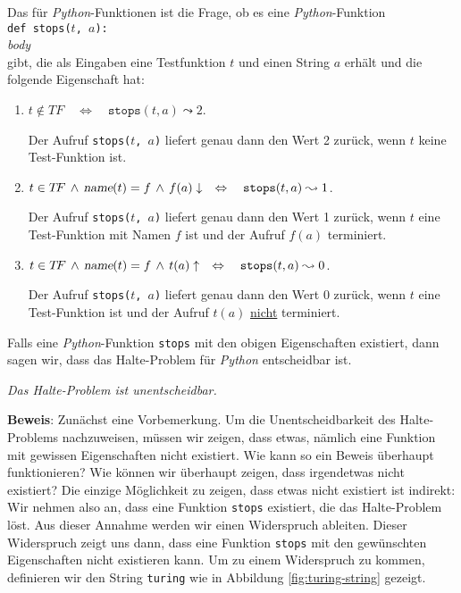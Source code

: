 \noindent
Das  für
\textsl{Python}-Funktionen ist die Frage, ob es eine \textsl{Python}-Funktion \\[0.2cm] 
\hspace*{1.3cm} \texttt{def stops($t$, $a$):}\\
\hspace*{2.1cm} \textsl{body}
\\[0.2cm]
gibt, die als Eingaben eine Testfunktion $t$ und einen String $a$ erhält und die folgende
Eigenschaft hat:
\begin{enumerate}
\item $t \not\in T\!F \quad\Leftrightarrow\quad \texttt{stops}(t, a) \leadsto 2$.

      Der Aufruf \texttt{stops($t$, $a$)} liefert genau dann den Wert 2 zurück, 
      wenn $t$ keine Test-Funktion ist.
\item $t \in T\!F \,\wedge\, \textsl{name}(t) = f \,\wedge\, f(a)\downarrow \quad\Leftrightarrow\quad
       \texttt{stops}(t, a) \leadsto 1$.

      Der Aufruf \texttt{stops($t$, $a$)} liefert genau dann den Wert 1 zurück,
      wenn $t$ eine Test-Funktion mit Namen $f$ ist und der Aufruf $f(a)$ terminiert.

\item $t \in T\!F  \,\wedge\, \textsl{name}(t) = f \,\wedge\, t(a)\uparrow \quad\Leftrightarrow\quad
       \texttt{stops}(t, a) \leadsto 0$.

      Der Aufruf \texttt{stops($t$, $a$)} liefert genau dann den Wert 0 zurück,
      wenn $t$ eine Test-Funktion ist und der Aufruf $t(a)$ \underline{nicht} terminiert.
\end{enumerate}
Falls eine \textsl{Python}-Funktion \texttt{stops} mit den obigen Eigenschaften existiert, dann
sagen wir, dass das Halte-Problem für \textsl{Python} entscheidbar ist.

\begin{Theorem}
{\em
  Das Halte-Problem ist unentscheidbar.
} 
\end{Theorem}

\noindent
\textbf{Beweis}:  Zunächst eine Vorbemerkung.  Um die Unentscheidbarkeit des
Halte-Problems nachzuweisen, müssen wir zeigen, dass etwas, nämlich eine Funktion mit
gewissen Eigenschaften nicht existiert.  Wie kann so ein Beweis überhaupt funktionieren?
Wie können wir überhaupt zeigen, dass irgendetwas nicht existiert?
Die einzige Möglichkeit zu zeigen, dass etwas nicht existiert ist indirekt:
Wir nehmen also an, dass eine Funktion \texttt{stops} existiert, die das Halte-Problem löst.
Aus dieser Annahme werden wir einen Widerspruch ableiten.  Dieser Widerspruch zeigt
uns dann, dass eine Funktion \texttt{stops} mit den gewünschten Eigenschaften nicht
existieren kann.
Um zu einem Widerspruch zu kommen, definieren wir den String \texttt{turing} wie in Abbildung
\ref{fig:turing-string} gezeigt.

